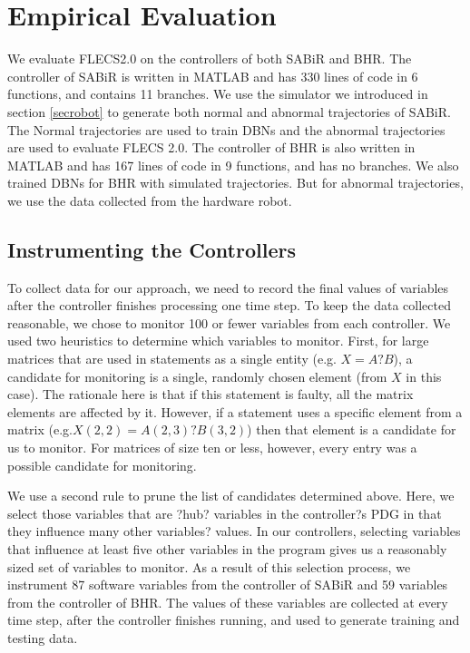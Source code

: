 \section{Empirical Evaluation}
We evaluate FLECS2.0 on the controllers of both SABiR and BHR. The controller of SABiR is written in MATLAB and has 330 lines of code in 6 functions, and contains 11 branches. We use the simulator we introduced in section \ref{secrobot} to generate both normal and abnormal trajectories of SABiR. The Normal trajectories are used to train DBNs and the abnormal trajectories are used to evaluate FLECS 2.0. The controller of BHR is also written in MATLAB and has 167 lines of code in 9 functions, and has no branches. We also trained DBNs for BHR with simulated trajectories. But for abnormal trajectories, we use the data collected from the hardware robot.

\subsection{Instrumenting the Controllers}
To collect data for our approach, we need to record the final values of variables after the controller finishes processing one time step. To keep the data collected reasonable, we chose to monitor 100 or fewer variables from each controller. We used two heuristics to determine which variables to monitor. First, for large matrices that are used in statements as a single entity (e.g. $X = A?B$), a candidate for monitoring is a single, randomly chosen element (from $X$ in this case). The rationale here is that if this statement is faulty, all the matrix elements are affected by it. However, if a statement uses a specific element from a matrix (e.g.$X(2, 2) = A(2, 3) ? B(3, 2)$) then that element is a candidate for us to monitor. For matrices of size ten or less, however, every entry was a possible candidate for monitoring.

We use a second rule to prune the list of candidates determined above. Here, we select those variables that are ?hub? variables in the controller?s PDG in that they influence many other variables? values. In our controllers, selecting variables that influence at least five other variables in the program gives us a reasonably sized set of variables to monitor. As a result of this selection process, we instrument 87 software variables from the controller of SABiR and 59 variables from the controller of BHR. The values of these variables are collected at every time step, after the controller finishes running, and used to generate training and testing data.


